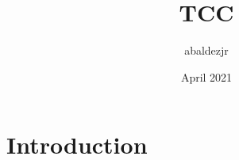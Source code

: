 \documentclass{article}
\title{TCC}
\author{abaldezjr }
\date{April 2021}
\begin{document}
\maketitle

\section{Introduction}
\end{document}
